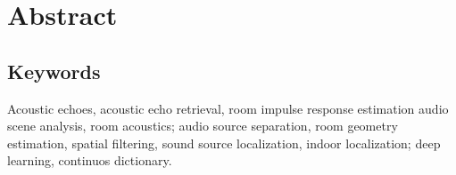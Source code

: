 \chapter*{Abstract}


\section{Keywords}
Acoustic echoes, acoustic echo retrieval, room impulse response estimation
audio scene analysis, room acoustics;
audio source separation, room geometry estimation, spatial filtering, sound source localization, indoor localization;
deep learning, continuos dictionary.